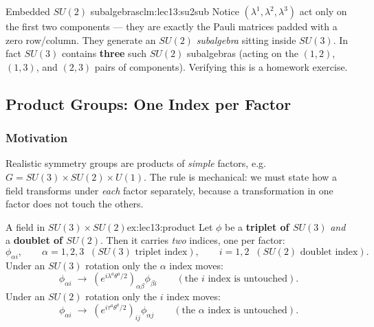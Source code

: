 \documentclass[../main.tex]{subfiles}
\begin{document}
\begin{Claim}{Embedded $SU(2)$ subalgebras}{clm:lec13:su2sub}
Notice $(\lambda^1,\lambda^2,\lambda^3)$ act only on the first two components --- they are exactly the Pauli matrices padded with a zero row/column. They generate an $SU(2)$ \emph{subalgebra} sitting inside $SU(3)$. In fact $SU(3)$ contains \textbf{three} such $SU(2)$ subalgebras (acting on the $(1,2)$, $(1,3)$, and $(2,3)$ pairs of components). Verifying this is a homework exercise.
\end{Claim}

\subsection{Product Groups: One Index per Factor}\label{sec:lec13:product}

\subsubsection*{Motivation}

Realistic symmetry groups are products of \emph{simple} factors, e.g.\ $G = SU(3)\times SU(2)\times U(1)$. The rule is mechanical: we must state how a field transforms under \emph{each} factor separately, because a transformation in one factor does not touch the others.

\begin{Example}{A field in $SU(3)\times SU(2)$}{ex:lec13:product}
Let $\phi$ be a \textbf{triplet of $SU(3)$} \emph{and} a \textbf{doublet of $SU(2)$}. Then it carries \emph{two} indices, one per factor:
\begin{equation*}
  \phi_{\alpha i},
  \qquad
  \alpha = 1,2,3 \;\;(SU(3)\text{ triplet index}),
  \qquad
  i = 1,2 \;\;(SU(2)\text{ doublet index}).
\end{equation*}
Under an $SU(3)$ rotation only the $\alpha$ index moves:
\begin{equation*}
  \phi_{\alpha i} \;\to\; \left(e^{i\lambda^a\theta^a/2}\right)_{\alpha\beta}\phi_{\beta i}
  \qquad(\text{the }i\text{ index is untouched}).
\end{equation*}
Under an $SU(2)$ rotation only the $i$ index moves:
\begin{equation*}
  \phi_{\alpha i} \;\to\; \left(e^{i\tau^a\theta^a/2}\right)_{ij}\phi_{\alpha j}
  \qquad(\text{the }\alpha\text{ index is untouched}).
\end{equation*}
\end{Example}
\end{document}
